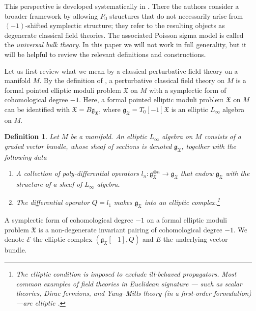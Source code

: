 \documentclass[11pt]{article}
\numberwithin{equation}{section}
\newtheorem{definition}{Definition}[section]
\begin{document}
This perspective is developed systematically in \cite{butson2016degenerate}. There the authors consider a broader framework by allowing $P_0$ structures that do not necessarily arise from $(-1)$-shifted symplectic structure; they refer to the resulting objects as degenerate classical field theories. The associated Poisson sigma model is called the \emph{universal bulk theory}. In this paper we will not work in full generality, but it will be helpful to review the relevant definitions and constructions.

Let us first review what we mean by a classical perturbative field theory on a manifold $M$. By the definition of \cite{costello2017factorization,costello2021factorization}, a perturbative classical field theory on $M$ is a formal pointed elliptic moduli problem $\mathfrak{X}$ on $M$ with a symplectic form of cohomological degree $-1$. Here, a formal pointed elliptic moduli problem $\mathfrak{X}$ on $M$ can be identified with $\mathfrak{X} = B\mathfrak{g}_{\mathfrak{X}}$, where $\mathfrak{g}_{\mathfrak{X}} = T_0[-1]\mathfrak{X}$ is an elliptic $L_\infty$ algebra on $M$.
\begin{definition}
	Let $M$ be a manifold. An elliptic $L_\infty$ algebra on $M$ consists of a graded vector bundle, whose sheaf of sections is denoted $\mathfrak{g}_{\mathfrak{X}}$, together with the following data
	\begin{enumerate}
		\item A collection of poly-differential operators $l_n: \mathfrak{g}_{\mathfrak{X}}^{\otimes n} \to \mathfrak{g}_{\mathfrak{X}}$ that endow $\mathfrak{g}_{\mathfrak{X}}$ with the structure of a sheaf of $L_\infty$ algebra.
		\item The differential operator $Q = l_1$ makes $\mathfrak{g}_{\mathfrak{X}}$ into an elliptic complex.\footnote{The elliptic condition is imposed to exclude ill-behaved propagators. Most common examples of field theories in Euclidean signature — such as scalar theories, Dirac fermions, and Yang--Mills theory (in a first-order formulation)—are elliptic \cite{costello2011re}.}
	\end{enumerate}
\end{definition}
A symplectic form of cohomological degree $-1$ on a formal elliptic moduli problem $\mathfrak{X}$ is a non-degenerate invariant pairing of cohomological degree $-1$. We denote $\mathcal{E}$ the elliptic complex $(\mathfrak{g}_{\mathfrak{X}}[-1],Q)$ and $E$ the underlying vector bundle.
\end{document}
